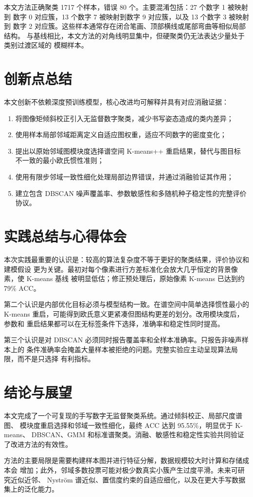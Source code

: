 \documentclass[12pt,a4paper,UTF8]{ctexart}
\begin{document}
本文方法正确聚类 1717 个样本，错误 80 个。主要混淆包括：27 个数字 1 被映射到
数字 0 对应簇，13 个数字 7 被映射到数字 9 对应簇，以及 13 个数字 3 被映射到
数字 2 对应簇。这些样本通常存在闭合笔画、顶部横线或尾部弯曲等相似局部结构。
与基线相比，本文方法的对角线明显集中，但硬聚类仍无法表达少量处于类别过渡区域的
模糊样本。

\section{创新点总结}

本文创新不依赖深度预训练模型，核心改进均可解释并具有对应消融证据：

\begin{enumerate}
    \item 将图像矩倾斜校正引入无监督数字聚类，减少书写姿态造成的类内差异；
    \item 使用样本局部邻域距离定义自适应图权重，适应不同数字的密度变化；
    \item 提出以原始邻域图模块度选择谱空间 K-means++ 重启结果，替代与图目标
    不一致的最小欧氏惯性准则；
    \item 使用有限步邻域一致性细化处理局部边界错误，并通过消融验证其作用；
    \item 建立包含 DBSCAN 噪声覆盖率、参数敏感性和多随机种子稳定性的完整评价协议。
\end{enumerate}

\section{实践总结与心得体会}

本次实践最重要的认识是：较高的算法复杂度不等于更好的聚类结果，评价协议和建模假设
更为关键。最初对每个像素进行方差标准化会放大几乎恒定的背景像素，使 K-means 基线
被明显低估；修正预处理后，原始像素 K-means 已达到约 79\% ACC。

第二个认识是内部优化目标必须与模型结构一致。在谱空间中简单选择惯性最小的
K-means 重启，可能得到欧氏意义更紧凑但图结构更差的划分。改用模块度后，参数和
重启结果都可以在无标签条件下选择，准确率和稳定性同时提高。

第三个认识是对 DBSCAN 必须同时报告覆盖率和全样本准确率。只报告非噪声样本上的
条件准确率会掩盖大量样本被拒绝的问题。完整实验应主动呈现算法局限，而不是只选择
有利指标。

\section{结论与展望}

本文完成了一个可复现的手写数字无监督聚类系统。通过倾斜校正、局部尺度谱图、
模块度重启选择和邻域一致性细化，最终 ACC 达到 95.55\%，明显优于 K-means、
DBSCAN、GMM 和标准谱聚类。消融、敏感性和稳定性实验共同验证了改进方法的有效性。

方法的主要局限是需要构建样本图并进行特征分解，数据规模较大时计算和存储成本会
增加；此外，邻域多数投票可能对极少数真实小簇产生过度平滑。未来可研究近似近邻、
Nystr\"om 谱近似、置信度约束的自适应细化，以及在更大手写数据集上的泛化能力。

\nocite{dalal2005,rousseeuw1987}
\end{document}
